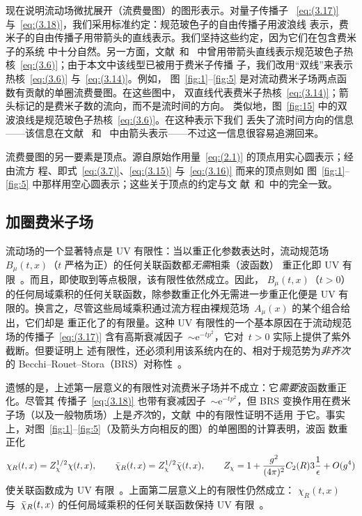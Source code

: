 现在说明流动场微扰展开（流费曼图）的图形表示。对量子传播子%
~\eqref{eq:(3.17)} 与~\eqref{eq:(3.18)}，我们采用标准约定：规范玻色子的自由传播子用波浪线
表示，费米子的自由传播子用带箭头的直线表示。我们坚持这些约定，因为它们在包含费米子的系统
中十分自然。另一方面，文献~\cite{Suzuki:2013gza}和~\cite{Luscher:2011bx}
中曾用带箭头直线表示规范玻色子热核~\eqref{eq:(3.6)}；由于本文中该线型已被用于费米子传播
子，我们改用“双线”来表示热核~\eqref{eq:(3.6)} 与~\eqref{eq:(3.14)}。例如，
图~\ref{fig:1}--\ref{fig:5} 是对流动费米子场两点函数有贡献的单圈流费曼图。在这些图中，
双直线代表费米子热核~\eqref{eq:(3.14)}；箭头标记的是费米子数的流向，而不是流时间的方向。
类似地，图~\ref{fig:15} 中的双波浪线是规范玻色子热核~\eqref{eq:(3.6)}。在这种表示下我们
丢失了流时间方向的信息——该信息在文献~\cite{Suzuki:2013gza}
和~\cite{Luscher:2011bx} 中由箭头表示——不过这一信息很容易追溯回来。

流费曼图的另一要素是顶点。源自原始作用量~\eqref{eq:(2.1)} 的顶点用实心圆表示；经由流方
程、即式~\eqref{eq:(3.7)}、\eqref{eq:(3.15)} 与~\eqref{eq:(3.16)} 而来的顶点则如
图~\ref{fig:1}--\ref{fig:5} 中那样用空心圆表示；这些关于顶点的约定与文
献~\cite{Suzuki:2013gza}和~\cite{Luscher:2011bx}中的完全一致。

\subsection{加圈费米子场}
流动场的一个显著特点是 UV 有限性：当以重正化参数表达时，流动规范场 $B_\mu(t,x)$（$t$
严格为正）的任何关联函数都\emph{无需\/}相乘（波函数）
重正化即 UV 有限~\cite{Luscher:2011bx}。而且，即使取到等点极限，该有限性依然成立。因此，
$B_\mu(t,x)$（$t>0$）的任何局域乘积的任何关联函数，除参数重正化外无需进一步重正化便是 UV
有限的。换言之，尽管这些局域乘积通过流方程由裸规范场~$A_\mu(x)$ 的某个组合给出，它们却是
重正化了的有限量。这种 UV 有限性的一个基本原因在于流动规范场的传播子~\eqref{eq:(3.17)}
含有高斯衰减因子~$\sim \mathrm{e}^{-tp^2}$，它对~$t>0$ 实际上提供了紫外截断。但要证明上
述有限性，还必须利用该系统内在的、相对于规范势为\emph{非齐次\/}的
Becchi--Rouet--Stora（BRS）对称性~\cite{Luscher:2011bx}。

遗憾的是，上述第一层意义的有限性对流费米子场并不成立：它\emph{需要\/}波函数重正化。尽管其
传播子~\eqref{eq:(3.18)} 也带有衰减因子~$\sim \mathrm{e}^{-tp^2}$，但 BRS 变换作用在费米
子场（以及一般物质场）上是\emph{齐次\/}的，文献~\cite{Luscher:2011bx}中的有限性证明不适用
于它。事实上，对图~\ref{fig:1}--\ref{fig:5}（及箭头方向相反的图）的单圈图的计算表明，波函
数重正化
\begin{equation}
   \chi_R(t,x)=Z_\chi^{1/2}\chi(t,x),\qquad
   \Bar{\chi}_R(t,x)=Z_\chi^{1/2}\Bar{\chi}(t,x),\qquad
   Z_\chi=1+\frac{g^2}{(4\pi)^2}C_2(R)3\frac{1}{\epsilon}+O(g^4)
\label{eq:(3.19)}
\end{equation}
使关联函数成为 UV 有限~\cite{Luscher:2013cpa}。上面第二层意义上的有限性仍然成立：
$\chi_R(t,x)$ 与~$\Bar{\chi}_R(t,x)$ 的任何局域乘积的任何关联函数保持 UV
有限~\cite{Luscher:2013cpa}。


